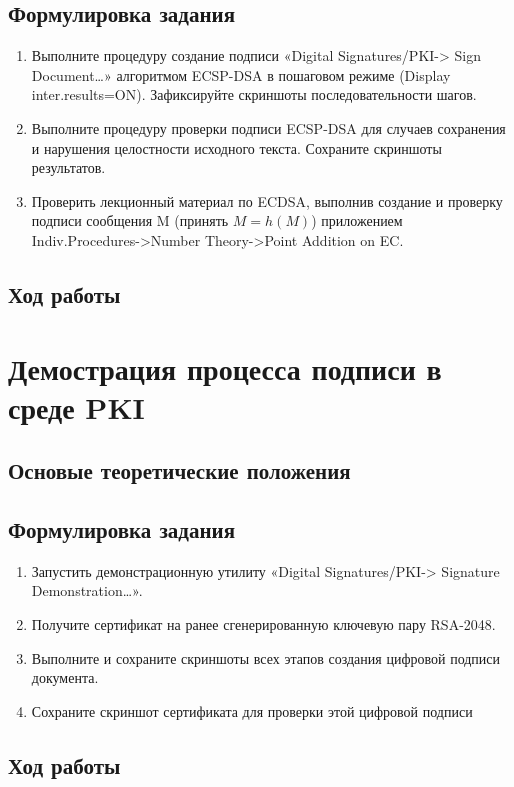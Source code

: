 \documentclass[a4paper, 14pt]{extarticle}
\begin{document}
\subsection{Формулировка задания}
\begin{enumerate}
    \item Выполните процедуру создание подписи «Digital Signatures/PKI-> Sign Document…» алгоритмом ECSP-DSA в пошаговом режиме (Display inter.results=ON). Зафиксируйте скриншоты последовательности шагов.
    \item Выполните процедуру проверки подписи ECSP-DSA для случаев сохранения и нарушения целостности исходного текста. Сохраните скриншоты результатов.
    \item Проверить лекционный материал по ECDSA, выполнив создание и проверку подписи сообщения M (принять $M=h(M)$) приложением Indiv.Procedures->Number Theory->Point Addition on EC.\@
\end{enumerate}

\subsection{Ход работы}
\lipsum[1] %

\section{Демострация процесса подписи в среде PKI}
\subsection{Основые теоретические положения}
\lipsum[1] %

\subsection{Формулировка задания}
\begin{enumerate}
    \item Запустить демонстрационную утилиту «Digital Signatures/PKI-> Signature Demonstration…».
    \item Получите сертификат на ранее сгенерированную ключевую пару RSA-2048.
    \item Выполните и сохраните скриншоты всех этапов создания цифровой подписи документа.
    \item Сохраните скриншот сертификата для проверки этой цифровой подписи
\end{enumerate}

\subsection{Ход работы}
\lipsum[1] %
\end{document}
